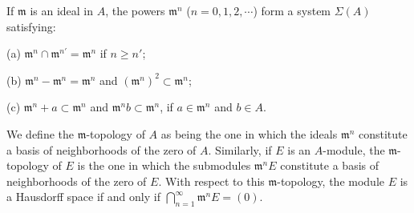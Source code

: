 If $\mathfrak{m}$ is an ideal in $A$, the powers $\mathfrak{m}^n$ ($n = 0, 1, 2, \cdots$) form a system $\Sigma(A)$ satisfying:

(a) $\mathfrak{m}^n \cap \mathfrak{m}^{n'} = \mathfrak{m}^n$ if $n \geq n'$;

(b) $\mathfrak{m}^n - \mathfrak{m}^n = \mathfrak{m}^n$ and $(\mathfrak{m}^n)^2 \subset \mathfrak{m}^n$;

(c) $\mathfrak{m}^n + a \subset \mathfrak{m}^n$ and $\mathfrak{m}^n b \subset \mathfrak{m}^n$, if $a \in \mathfrak{m}^n$ and $b \in A$.

We define the $\mathfrak{m}$-topology of $A$ as being the one in which the ideals $\mathfrak{m}^n$ constitute a basis of neighborhoods of the zero of $A$. Similarly, if $E$ is an $A$-module, the $\mathfrak{m}$-topology of $E$ is the one in which the submodules $\mathfrak{m}^n E$ constitute a basis of neighborhoods of the zero of $E$. With respect to this $\mathfrak{m}$-topology, the module $E$ is a Hausdorff space if and only if $\bigcap_{n=1}^{\infty} \mathfrak{m}^n E = (0)$.